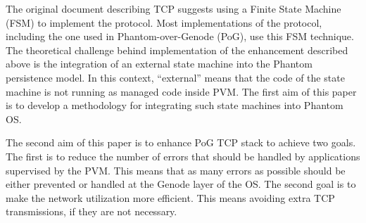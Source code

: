 The original document describing TCP \cite{john1981transmission} suggests using
a Finite State Machine (FSM) to implement the protocol. Most implementations of
the protocol, including the one used in Phantom-over-Genode (PoG), use this FSM
technique. The theoretical challenge behind implementation of the enhancement
described above is the integration of an external state machine into the
Phantom persistence model. In this context, “external” means that the code of
the state machine is not running as managed code inside PVM. The first aim of
this paper is to develop a methodology for integrating such state machines into
Phantom OS.  

The second aim of this paper is to enhance PoG TCP stack to achieve two goals.
The first is to reduce the number of errors that should be handled by
applications supervised by the PVM. This means that as many errors as possible
should be either prevented or handled at the Genode layer of the OS. The second
goal is to make the network utilization more efficient. This means avoiding
extra TCP transmissions, if they are not necessary.
